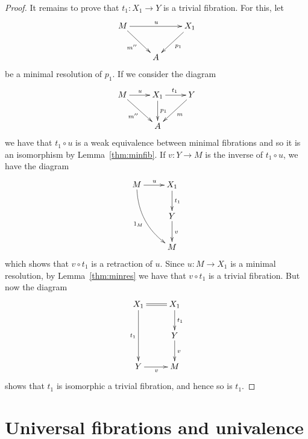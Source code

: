 \documentclass[reqno,10pt,a4paper,oneside]{amsart}
\theoremstyle{definition}
\newcommand{\co}{\colon}
\newcommand{\cat}[1]{\mathbb{#1}}
\newcommand{\catC}{\cat{C}}
\begin{document}
\begin{proof}
  \medskip
 
 It remains to prove that $t_1 \co X_1 \to Y$ is a trivial fibration. For this, let 
 \[
 \xymatrix{
 M \ar[dr]_{m''} \ar[rr]^{u} & & X_1 \ar[dl]^{p_1} \\
  & A & }
  \]
  be a minimal resolution of $p_1$.      If we consider the diagram
  \[
  \xymatrix{
  M \ar[dr]_{m''} \ar[r]^{u} & X_1 \ar[r]^{t_1} \ar[d]^{p_1} & Y \ar[dl]^{m} \\
   & A &   }
   \]
   we have that $t_1 \circ u$ is a weak equivalence between minimal fibrations and so it is
   an isomorphism by Lemma~\ref{thm:minfib}. If $v \co Y \to M$ is the inverse of $t_1  \circ u$,
   we have the diagram
   \[
   \xymatrix{
   M \ar[r]^u \ar@/_1pc/[ddr]_{1_M} & X_1 \ar[d]^{t_1} \\
     & Y \ar[d]^{v} \\
     & M}
     \]
which shows that $v \circ t_1$ is a retraction of $u$. Since $u \co M \to X_1$ 
is a minimal resolution, by Lemma~\ref{thm:minres} we have that $v \circ t_1$ is
a trivial fibration. But now the diagram 
 \[
 \xymatrix{
 X_1 \ar@{=}[r] \ar[dd]_{t_1} & X_1 \ar[d]^{t_1} \\
  & Y \ar[d]^{v} \\
  Y \ar[r]_v & M }
  \]
shows that $t_1$ is isomorphic a trivial
fibration, and hence so is $t_1$.
\end{proof}


\section{Universal fibrations and univalence}

\newcommand{\pshC}{\widehat{\catC}}
\newcommand{\Set}{\mathbf{Set}}
\newcommand{\yon}{\operatorname{y}}
\end{document}
